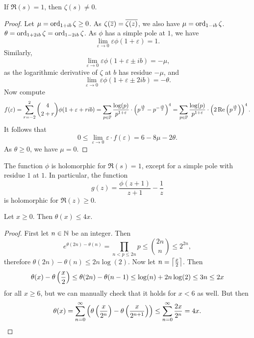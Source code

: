\begin{izrek}
If $\Re(s) = 1$, then $\zeta(s) \ne 0$.
\end{izrek}

\begin{proof}
Let $\mu = \operatorname{ord}_{1 + ib} \zeta \geq 0$. As
$\zeta(\overline{z}) = \overline{\zeta(z)}$, we also have
$\mu = \operatorname{ord}_{1 - ib} \zeta$.
$\theta = \operatorname{ord}_{1 + 2ib} \zeta = \operatorname{ord}_{1 - 2ib} \zeta$. As $\phi$
has a simple pole at $1$, we have
\[
\lim_{\varepsilon \to 0} \varepsilon \phi(1+\varepsilon) = 1.
\]
Similarly,
\[
\lim_{\varepsilon \to 0} \varepsilon \phi(1 + \varepsilon \pm ib) =
-\mu,
\]
as the logarithmic derivative of $\zeta$ at $b$ has residue $-\mu$,
and
\[
\lim_{\varepsilon \to 0}
\varepsilon \phi(1 + \varepsilon \pm 2ib) =
-\theta.
\]
Now compute
\[
f(\varepsilon) =
\sum_{r=-2}^2 \binom{4}{2+r} \phi(1 + \varepsilon + rib) =
\sum_{p \in \mathbb{P}} \frac{\log(p)}{p^{1+\varepsilon}} \cdot
\left(p^{\frac{ib}{2}} - p^{-\frac{ib}{2}}\right)^4 =
\sum_{p \in \mathbb{P}} \frac{\log(p)}{p^{1+\varepsilon}} \cdot
\left(2 \operatorname{Re} \left(p^{\frac{ib}{2}}\right)\right)^4.
\]
It follows that
\[
0 \leq
\lim_{\varepsilon \to 0} \varepsilon \cdot f(\varepsilon) =
6 - 8 \mu - 2 \theta.
\]
As $\theta \geq 0$, we have $\mu = 0$.
\end{proof}

\begin{posledica}
\label{prime:cor:g_def}
The function $\phi$ is holomorphic for $\Re(s) = 1$, except for a
simple pole with residue $1$ at $1$. In particular, the function
\[
g(z) = \frac{\phi(z+1)}{z+1} - \frac{1}{z}
\]
is holomorphic for $\Re(z) \geq 0$.
\end{posledica}

\obvs


\begin{lema}
Let $x \geq 0$. Then $\theta(x) \leq 4x$.
\end{lema}

\begin{proof}
First let $n \in \mathbb{N}$ be an integer. Then
\[
e^{\theta(2n) - \theta(n)} =
\prod_{n < p \leq 2n} p \leq
\binom{2n}{n} \leq
2^{2n},
\]
therefore $\theta(2n) - \theta(n) \leq 2n \log(2)$. Now let
$n = \left\lceil \frac{x}{2}\right\rceil$. Then
\[
\theta(x) - \theta \left(\frac{x}{2}\right) \leq
\theta(2n) - \theta(n-1) \leq
\log(n) + 2n \log(2) \leq
3n \leq
2x
\]
for all $x \geq 6$, but we can manually check that it holds for
$x < 6$ as well. But then
\[
\theta(x) =
\sum_{n=0}^\infty
\left(\theta \left(\frac{x}{2^n}\right) - \theta \left(\frac{x}{2^{n+1}}\right)\right) \leq
\sum_{n=0}^\infty \frac{2x}{2^n} =
4x. \qedhere
\]
\end{proof}

